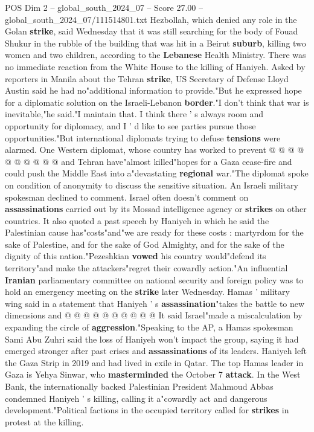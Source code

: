 \begin{textsample}{POS Dim 2 – global\_south\_2024\_07 – Score 27.00 – global\_south\_2024\_07/111514801.txt}
Hezbollah, which denied any role in the Golan \textbf{strike}, said Wednesday that it was still searching for the body of Fouad Shukur in the rubble of the building that was hit in a Beirut \textbf{suburb}, killing two women and two children, according to the \textbf{Lebanese} Health Ministry.
There was no immediate reaction from the White House to the killing of Haniyeh.
Asked by reporters in Manila about the Tehran \textbf{strike}, US Secretary of Defense Lloyd Austin said he had no"additional information to provide."But he expressed hope for a diplomatic solution on the Israeli-Lebanon \textbf{border}."I don't think that war is inevitable,"he said."I maintain that.
I think there ' s always room and opportunity for diplomacy, and I ' d like to see parties pursue those opportunities."But international diplomats trying to defuse \textbf{tensions} were alarmed.
One Western diplomat, whose country has worked to prevent @ @ @ @ @ @ @ @ @ @ and Tehran have"almost killed"hopes for a Gaza cease-fire and could push the Middle East into a"devastating \textbf{regional} war."The diplomat spoke on condition of anonymity to discuss the sensitive situation.
An Israeli military spokesman declined to comment.
Israel often doesn't comment on \textbf{assassinations} carried out by its Mossad intelligence agency or \textbf{strikes} on other countries.
It also quoted a past speech by Haniyeh in which he said the Palestinian cause has"costs"and"we are ready for these costs : martyrdom for the sake of Palestine, and for the sake of God Almighty, and for the sake of the dignity of this nation."Pezeshkian \textbf{vowed} his country would"defend its territory"and make the attackers"regret their cowardly action."An influential \textbf{Iranian} parliamentary committee on national security and foreign policy was to hold an emergency meeting on the \textbf{strike} later Wednesday.
Hamas ' military wing said in a statement that Haniyeh ' s \textbf{assassination}"takes the battle to new dimensions and @ @ @ @ @ @ @ @ @ @ It said Israel"made a miscalculation by expanding the circle of \textbf{aggression}."Speaking to the AP, a Hamas spokesman Sami Abu Zuhri said the loss of Haniyeh won't impact the group, saying it had emerged stronger after past crises and \textbf{assassinations} of its leaders.
Haniyeh left the Gaza Strip in 2019 and had lived in exile in Qatar.
The top Hamas leader in Gaza is Yehya Sinwar, who \textbf{masterminded} the October 7 \textbf{attack}.
In the West Bank, the internationally backed Palestinian President Mahmoud Abbas condemned Haniyeh ' s killing, calling it a"cowardly act and dangerous development."Political factions in the occupied territory called for \textbf{strikes} in protest at the killing.

\end{textsample}
